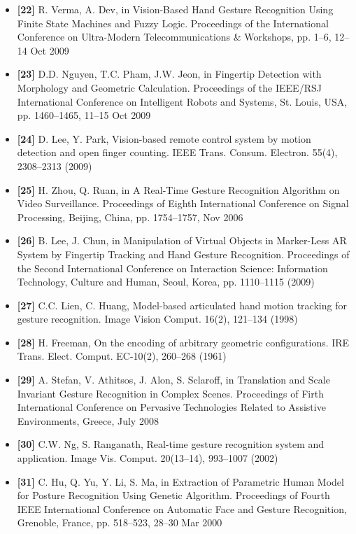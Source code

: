 \documentclass[12pt, a4paper]{article}
\begin{document}
\begin{itemize}[label=]
    \item \textbf{[22]} R. Verma, A. Dev, in Vision-Based Hand Gesture Recognition Using Finite State Machines and Fuzzy Logic. Proceedings of the International Conference on Ultra-Modern Telecommunications \& Workshops, pp. 1–6, 12–14 Oct 2009
    \item \textbf{[23]} D.D. Nguyen, T.C. Pham, J.W. Jeon, in Fingertip Detection with Morphology and Geometric Calculation. Proceedings of the IEEE/RSJ International Conference on Intelligent Robots and Systems, St. Louis, USA, pp. 1460–1465, 11–15 Oct 2009
    \item \textbf{[24]} D. Lee, Y. Park, Vision-based remote control system by motion detection and open finger counting. IEEE Trans. Consum. Electron. 55(4), 2308–2313 (2009)
    \item \textbf{[25]} H. Zhou, Q. Ruan, in A Real-Time Gesture Recognition Algorithm on Video Surveillance. Proceedings of Eighth International Conference on Signal Processing, Beijing, China, pp. 1754–1757, Nov 2006
    \item \textbf{[26]} B. Lee, J. Chun, in Manipulation of Virtual Objects in Marker-Less AR System by Fingertip Tracking and Hand Gesture Recognition. Proceedings of the Second International Conference on Interaction Science: Information Technology, Culture and Human, Seoul, Korea, pp. 1110–1115 (2009)
    \item \textbf{[27]} C.C. Lien, C. Huang, Model-based articulated hand motion tracking for gesture recognition. Image Vision Comput. 16(2), 121–134 (1998)
    \item \textbf{[28]} H. Freeman, On the encoding of arbitrary geometric configurations. IRE Trans. Elect. Comput. EC-10(2), 260–268 (1961)
    \item \textbf{[29]} A. Stefan, V. Athitsos, J. Alon, S. Sclaroff, in Translation and Scale Invariant Gesture Recognition in Complex Scenes. Proceedings of Firth International Conference on Pervasive Technologies Related to Assistive Environments, Greece, July 2008
    \item \textbf{[30]} C.W. Ng, S. Ranganath, Real-time gesture recognition system and application. Image Vis. Comput. 20(13–14), 993–1007 (2002)
    \item \textbf{[31]} C. Hu, Q. Yu, Y. Li, S. Ma, in Extraction of Parametric Human Model for Posture Recognition Using Genetic Algorithm. Proceedings of Fourth IEEE International Conference on Automatic Face and Gesture Recognition, Grenoble, France, pp. 518–523, 28–30 Mar 2000

\end{itemize}
\end{document}
